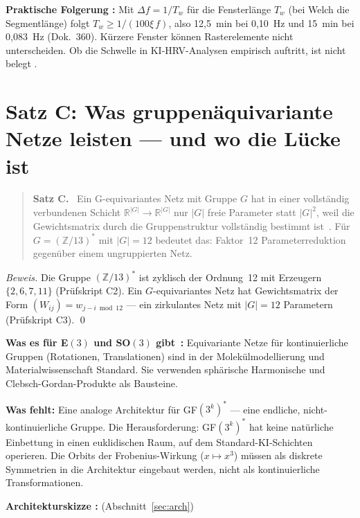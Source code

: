\textbf{Praktische Folgerung \KM:} Mit $\Delta f=1/T_w$ für die
Fensterlänge $T_w$ (bei Welch die Segmentlänge) folgt $T_w\ge1/(100\xi\,f)$,
also 12{,}5~min bei 0{,}10~Hz und 15~min bei 0{,}083~Hz (Dok.~360).
Kürzere Fenster können Rasterelemente nicht unterscheiden. Ob die
Schwelle in KI-HRV-Analysen empirisch auftritt, ist nicht belegt \SM.

\section{Satz C: Was gruppenäquivariante Netze leisten --- und wo die Lücke ist}

\begin{quote}
\textbf{Satz C.} \BM\ Ein G-equivariantes Netz mit Gruppe $G$ hat in
einer vollständig verbundenen Schicht $\mathbb{R}^{|G|}\to\mathbb{R}^{|G|}$
nur $|G|$ freie Parameter statt $|G|^2$, weil die Gewichtsmatrix
durch die Gruppenstruktur vollständig bestimmt ist \LM\,\cite{Finzi2022}.
Für $G = (\mathbb{Z}/13)^*$ mit $|G|=12$ bedeutet das: Faktor~12
Parameterreduktion gegenüber einem ungruppierten Netz.
\end{quote}

\emph{Beweis.} Die Gruppe $(\mathbb{Z}/13)^*$ ist zyklisch der Ordnung~12
mit Erzeugern $\{2,6,7,11\}$ (Prüfskript C2). Ein $G$-equivariantes Netz
hat Gewichtsmatrix der Form $(W_{ij}) = w_{j-i \bmod 12}$ --- ein
zirkulantes Netz mit $|G|=12$ Parametern (Prüfskript C3). \qed

\textbf{Was es für E$(3)$ und SO$(3)$ gibt \LM\,\cite{Finzi2022}:}
Equivariante Netze für kontinuierliche Gruppen (Rotationen, Translationen)
sind in der Molekülmodellierung und Materialwissenschaft Standard.
Sie verwenden sphärische Harmonische und Clebsch-Gordan-Produkte als
Bausteine.

\textbf{Was fehlt:} Eine analoge Architektur für GF$(3^k)^*$ --- eine
endliche, nicht-kontinuierliche Gruppe. Die Herausforderung: GF$(3^k)^*$
hat keine natürliche Einbettung in einen euklidischen Raum, auf dem
Standard-KI-Schichten operieren. Die Orbits der Frobenius-Wirkung
($x\mapsto x^3$) müssen als diskrete Symmetrien in die Architektur
eingebaut werden, nicht als kontinuierliche Transformationen.

\textbf{Architekturskizze \SM:} (Abschnitt~\ref{sec:arch})

